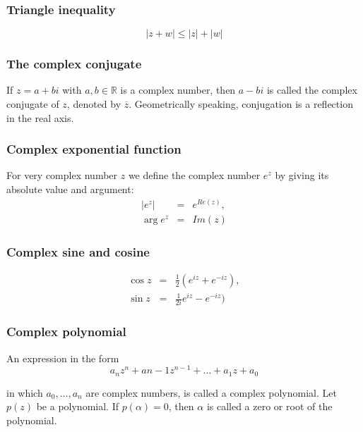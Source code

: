 \documentclass{article}
\begin{document}
			\subsubsection{Triangle inequality}
			\begin{equation*}
				|z + w| \leq |z| + |w|
			\end{equation*}
			
			\subsubsection{The complex conjugate}
			If $z = a+bi$ with $a,b \in \mathbb{R}$ is a complex number, then $a-bi$ is called the complex conjugate of $z$, denoted by $\overline{z}$. Geometrically speaking, conjugation is a reflection in the real axis.
			
			\subsubsection{Complex exponential function}
			For very complex number $z$ we define the complex number $e^z$ by giving its absolute value and argument:
			\begin{eqnarray*}
				|e^z| &=& e^{Re(z)}, \\
				\arg{e^z} &=& Im(z)
			\end{eqnarray*}
		
			\subsubsection{Complex sine and cosine}
			\begin{eqnarray*}
				\cos{z} &=& \frac{1}{2}(e^{iz} + e^{-iz}), \\
				\sin{z} &=& \frac{1}{2i}e^{iz} - e^{-iz})
			\end{eqnarray*}
		
			\subsubsection{Complex polynomial}
			An expression in the form
			\begin{equation*}
				a_nz^n + a{n-1}z^{n-1} + \dots + a_1z+a_0
			\end{equation*}
			
			in which $a_0,\dots,a_n$ are complex numbers, is called a complex polynomial. Let $p(z)$ be a polynomial. If $p(\alpha) = 0$, then $\alpha$ is called a zero or root of the polynomial.
			
\end{document}
